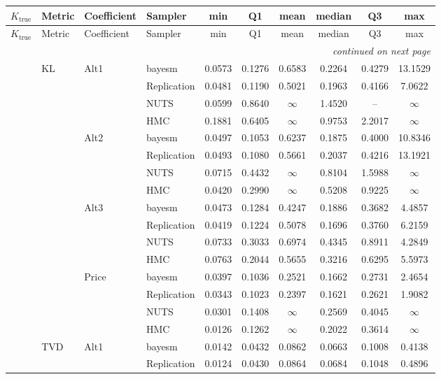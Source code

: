 \begin{longtable}{clllcccccc}
\toprule
$K_{\text{true}}$ & Metric & Coefficient & Sampler & min & Q1 & mean & median & Q3 & max \\
\midrule
\endfirsthead
\toprule
$K_{\text{true}}$ & Metric & Coefficient & Sampler & min & Q1 & mean & median & Q3 & max \\
\midrule
\endhead
\midrule
\multicolumn{10}{r}{\emph{continued on next page}} \\
\endfoot
\bottomrule
\endlastfoot
1 & KL & Alt1 & bayesm & 0.0573 & 0.1276 & 0.6583 & 0.2264 & 0.4279 & 13.1529 \\
 &  &  & Replication & 0.0481 & 0.1190 & 0.5021 & 0.1963 & 0.4166 & 7.0622 \\
 &  &  & NUTS & 0.0599 & 0.8640 & $\infty$ & 1.4520 & {--} & $\infty$ \\
 &  &  & HMC & 0.1881 & 0.6405 & $\infty$ & 0.9753 & 2.2017 & $\infty$ \\
 &  & Alt2 & bayesm & 0.0497 & 0.1053 & 0.6237 & 0.1875 & 0.4000 & 10.8346 \\
 &  &  & Replication & 0.0493 & 0.1080 & 0.5661 & 0.2037 & 0.4216 & 13.1921 \\
 &  &  & NUTS & 0.0715 & 0.4432 & $\infty$ & 0.8104 & 1.5988 & $\infty$ \\
 &  &  & HMC & 0.0420 & 0.2990 & $\infty$ & 0.5208 & 0.9225 & $\infty$ \\
 &  & Alt3 & bayesm & 0.0473 & 0.1284 & 0.4247 & 0.1886 & 0.3682 & 4.4857 \\
 &  &  & Replication & 0.0419 & 0.1224 & 0.5078 & 0.1696 & 0.3760 & 6.2159 \\
 &  &  & NUTS & 0.0733 & 0.3033 & 0.6974 & 0.4345 & 0.8911 & 4.2849 \\
 &  &  & HMC & 0.0763 & 0.2044 & 0.5655 & 0.3216 & 0.6295 & 5.5973 \\
 &  & Price & bayesm & 0.0397 & 0.1036 & 0.2521 & 0.1662 & 0.2731 & 2.4654 \\
 &  &  & Replication & 0.0343 & 0.1023 & 0.2397 & 0.1621 & 0.2621 & 1.9082 \\
 &  &  & NUTS & 0.0301 & 0.1408 & $\infty$ & 0.2569 & 0.4045 & $\infty$ \\
 &  &  & HMC & 0.0126 & 0.1262 & $\infty$ & 0.2022 & 0.3614 & $\infty$ \\
 & TVD & Alt1 & bayesm & 0.0142 & 0.0432 & 0.0862 & 0.0663 & 0.1008 & 0.4138 \\
 &  &  & Replication & 0.0124 & 0.0430 & 0.0864 & 0.0684 & 0.1048 & 0.4896 \\

\end{longtable}
